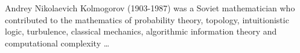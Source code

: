 \documentclass[preview]{standalone}
\begin{document}
\begin{center}
Andrey Nikolaevich Kolmogorov (1903-1987) was a Soviet mathematician who contributed to the mathematics of probability theory, topology, \newline intuitionistic logic, turbulence, classical mechanics, algorithmic information theory and computational complexity \break \ldots
\end{center}
\end{document}
